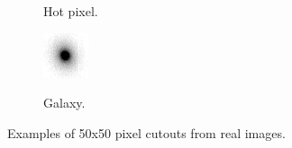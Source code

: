 \begin{figure}[!h]
\begin{subfigure}{.2\textwidth}
        \label{fig:fitsreal3e}
        \caption{Hot pixel.}
    \end{subfigure}
    \begin{subfigure}{.2\textwidth}
        \centering
        \includegraphics[width=\textwidth]{images/galaxy.png}
        \label{fig:fitsreal3f}
        \caption{Galaxy.}
    \end{subfigure}
    \caption{Examples of 50x50 pixel cutouts from real images.}
    \label{fig:fitsreal3}
\end{figure}
